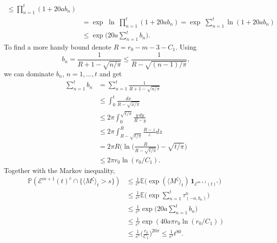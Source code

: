 \documentclass[11pt]{article}
\makeatletter
\renewenvironment{proof}[1][\proofname]{
   \par\pushQED{\qed}\normalfont
   \topsep6\p@\@plus6\p@\relax
   \trivlist\item[\hskip\labelsep\bfseries#1\@addpunct{.}]
   \ignorespaces
}{
   \popQED\endtrivlist\@endpefalse
}
\numberwithin{equation}{section}
\def\Ex{\mathbb{E}}
\makeatother
\begin{document}
\begin{proof}[Proof of Lemma \ref{no early points then smal QV}]
\begin{equation}
\begin{split}
        \leq \prod_{n=1}^{t} (1 + 20ab_n) \\
      & = \exp \; \ln \; \prod_{n=1}^{t} (1 + 20ab_n)
        = \exp \; \sum_{n=1}^{t} \ln(1 + 20ab_n)\\
      & \leq \exp \Big( 20a \sum_{n=1}^{t} b_n \Big).
    \end{split}
  \end{equation} 
  To find a more handy bound denote 
  $R = r_0 - m - 3 - C_1$. Using 
  $$
    b_n = \frac{1}{R + 1 - \sqrt{n / \pi}}  
        \leq \frac{1}{R - \sqrt{(n-1) / \pi}},
  $$
  we can dominate $b_n$, $n = 1,...,t$ and get
  \begin{equation} \nonumber
    \begin{split}
      \sum_{n=1}^{t} b_n 
      & = \sum_{n=1}^{t} 
          \frac{1}{R + 1 - \sqrt{n / \pi}} \\
      & \leq \int_0^{t} 
        \frac{dx}{R  - \sqrt{x / \pi}} \\
      & \leq 2 \pi \int_0^{\sqrt{t/ \pi}} 
        \frac{ y \, dy}{R  - y} \\
      & \leq 2\pi 
          \int_{R- \sqrt{t / \pi}}^R
            \frac{R-z}{z} dz\\
      & = 2\pi R \bigg(
        \ln \bigg( \frac{R}{R-\sqrt{t / \pi}} \bigg)
          - \sqrt{t / \pi} \bigg)\\
      & \leq 2\pi r_0 \ln(r_0 /C_1).
    \end{split}
  \end{equation}
  Together with the Markov inequality, 
  \begin{equation}\label{eq: last step of bound QV 1}
    \begin{split}
      \mathbb{P}(\mathcal{E}^{m+1} (t)^c \cap 
          \{ \langle M^{\zeta} \rangle _t > s \} )
      & \leq \frac{1}{e^s} 
            \Ex \big( \exp (\langle M^{\zeta} \rangle _t) 
                \, \boldsymbol{1}_{\mathcal{E}^{m+1} (t)^c} 
            \big)\\
      & \leq \frac{1}{e^s} 
        \Ex \bigg( \exp 
          \sum_{n=1}^{t} \tau^n_{(-a, b_n)} \bigg) \\
      & \leq
          \frac{1}{e^s} 
            \exp \Big( 20a \sum_{n=1}^{t} b_n \Big) \\
      & \leq \frac{1}{e^s}
        \exp (40a\pi r_0 \ln(r_0 / C_1)) \\
      & \leq \frac{1}{e^s} \bigg( \frac{r_0}{C_1} \bigg)^{20 \pi} 
      \leq \frac{1}{e^s} t^{80}.
    \end{split}
  \end{equation}
\end{proof}
\end{document}
